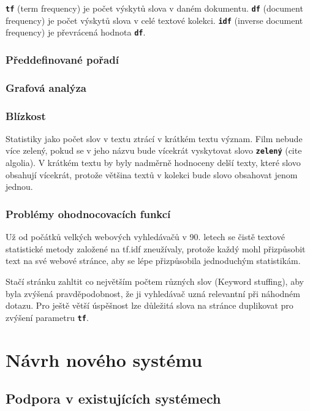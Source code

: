 \documentclass[12pt,letterpaper,oneside,openright]{book}
\newcommand{\bftt}[1]{\texttt{\textbf{#1}}}
\begin{document}
\bftt{tf} (term frequency) je počet výskytů slova v daném dokumentu. \bftt{df}
(document frequency) je počet výskytů slova v celé textové kolekci. \bftt{idf}
(inverse document frequency) je převrácená hodnota \bftt{df}.

\subsection{Předdefinované pořadí}

\subsection{Grafová analýza}

\subsection{Blízkost}
Statistiky jako počet slov v textu ztrácí v krátkém textu význam. Film
nebude více zelený, pokud se v jeho názvu bude vícekrát vyskytovat slovo
\bftt{zelený} (cite algolia). V krátkém textu by byly nadměrně hodnoceny
delší texty, které slovo obsahují vícekrát, protože většina textů v
kolekci bude slovo obsahovat jenom jednou.

\subsection{Problémy ohodnocovacích funkcí}
Už od počátků velkých webových vyhledávačů v 90. letech se čistě textové
statistické metody založené na tf.idf zneužívaly, protože každý mohl
přizpůsobit text na své webové stránce, aby se lépe přizpůsobila
jednoduchým statistikám.

Stačí stránku zahltit co největším počtem různých slov (Keyword
stuffing), aby byla zvýšená pravděpodobnost, že ji vyhledávač uzná
relevantní při náhodném dotazu. Pro ještě větší úspěšnost lze důležitá
slova na stránce duplikovat pro zvýšení parametru \bftt{tf}. 




\chapter{Návrh nového systému}
\section{Podpora v existujících systémech}
\end{document}
